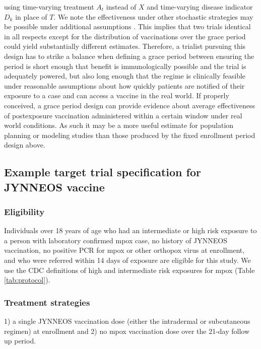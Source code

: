 \begin{appendices}
\begin{refsection}
    using time-varying treatment $A_t$ instead of $X$ and time-varying disease indicator $D_k$ in place of $T$. We note the effectiveness under other stochastic strategies may be possible under additional assumptions \cite{wanis_role_2022}. This implies that two trials identical in all respects except for the distribution of vaccinations over the grace period could yield substantially different estimates. Therefore, a trialist pursuing this design has to strike a balance when defining a grace period between ensuring the period is short enough that benefit is immunologically possible and the trial is adequately powered, but also long enough that the regime is clinically feasible under reasonable assumptions about how quickly patients are notified of their exposure to a case and can access a vaccine in the real world. If properly conceived, a grace period design can provide evidence about average effectiveness of postexposure vaccination administered within a certain window under real world conditions. As such it may be a more useful estimate for population planning or modeling studies than those produced by the fixed enrollment period design above. 
    
    \clearpage 

    \subsection{Example target trial specification for JYNNEOS vaccine}\label{sec:trial_spec}
    \subsubsection*{Eligibility}

    Individuals over 18 years of age who had an intermediate or high risk exposure to a person with laboratory confirmed mpox case, no history of JYNNEOS vaccination, no positive PCR for mpox or other orthopox virus at enrollment, and who were referred within 14 days of exposure are eligible for this study. We use the CDC definitions of high and intermediate risk exposures \cite{cdc_mpox_2022} for mpox (Table \ref{tab:protocol}).

    \subsubsection*{Treatment strategies}
    1) a single JYNNEOS vaccination dose (either the intradermal or subcutaneous regimen) at enrollment and 2) no mpox vaccination dose over the 21-day follow up period. 


\end{refsection}
\end{appendices}
